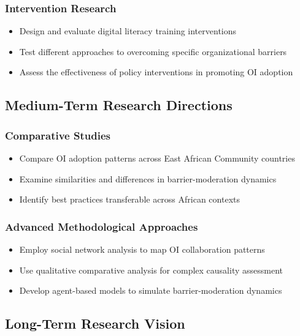 \subsubsection{Intervention Research}
\begin{itemize}
    \item Design and evaluate digital literacy training interventions
    \item Test different approaches to overcoming specific organizational barriers
    \item Assess the effectiveness of policy interventions in promoting OI adoption
\end{itemize}

\subsection{Medium-Term Research Directions}

\subsubsection{Comparative Studies}
\begin{itemize}
    \item Compare OI adoption patterns across East African Community countries
    \item Examine similarities and differences in barrier-moderation dynamics
    \item Identify best practices transferable across African contexts
\end{itemize}

\subsubsection{Advanced Methodological Approaches}
\begin{itemize}
    \item Employ social network analysis to map OI collaboration patterns
    \item Use qualitative comparative analysis for complex causality assessment
    \item Develop agent-based models to simulate barrier-moderation dynamics
\end{itemize}

\subsection{Long-Term Research Vision}

